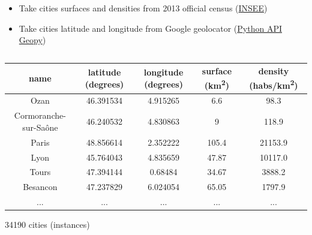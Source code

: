 \documentclass[c]{beamer}
\begin{document}
\begin{frame}
 \begin{itemize}
  \item Take cities surfaces and densities from 2013 official census (\href{http://www.insee.fr/fr/ppp/bases-de-donnees/recensement/populations-legales/pages2015/zip/HIST_POP_COM_RP13.zip}{INSEE})
  \item Take cities latitude and longitude from Google geolocator (\href{https://geopy.readthedocs.io/en/1.10.0/}{Python API Geopy})
 \end{itemize}

\begin{columns}
\begin{column}{0.80\textwidth}
\begin{overlayarea}{\linewidth}{3cm}
\begin{table}
\begin{center}
\begin{adjustbox}{max width=\textwidth}
{\LARGE
\begin{tabular}{|c|c|c|c|c|}
\hline 
name & latitude (degrees) & longitude (degrees) & surface (km\textsuperscript{2}) & density (habs/km\textsuperscript{2}) \\
\hline
Ozan & 46.391534 & 4.915265 & 6.6 & 98.3\\
\hline 
Cormoranche-sur-Sa\^{o}ne & 46.240532 & 4.830863 & 9 & 118.9\\
\hline 
Paris & 48.856614 & 2.352222 & 105.4 & 21153.9\\
\hline
Lyon & 45.764043 & 4.835659 & 47.87 & 10117.0\\
\hline
Tours & 47.394144 & 0.68484 & 34.67 & 3888.2\\
\hline
Besancon & 47.237829 & 6.024054 & 65.05 & 1797.9\\
\hline 
... & ... & ... & ... & ... \\
\hline
\end{tabular}
}
\end{adjustbox}
\end{center}
\end{table}
\end{overlayarea}
\begin{overlayarea}{\linewidth}{1cm}
  \centering
  \scriptsize34190 cities (instances)\par
\end{overlayarea}
\end{column}
\end{columns}

\end{frame}
\end{document}
